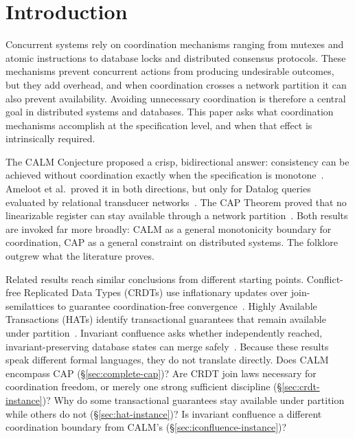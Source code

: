 \section{Introduction}
\label{sec:intro}

Concurrent systems rely on coordination mechanisms ranging from mutexes and
atomic instructions to database locks and distributed consensus protocols.
These mechanisms prevent concurrent actions from producing undesirable
outcomes, but they add overhead, and when coordination crosses a network
partition it can also prevent availability.  Avoiding unnecessary coordination
is therefore a central goal in distributed systems and databases.  This paper
asks what coordination mechanisms accomplish at the specification level, and
when that effect is intrinsically required.

The CALM Conjecture
proposed a crisp, bidirectional answer: consistency can be achieved without
coordination exactly when the specification is
monotone~\cite{hellerstein2010declarative}.  Ameloot et al.\ proved it in both
directions, but only for Datalog queries evaluated by relational
transducer networks~\cite{ameloot2013relational,hellerstein2020keeping}.  The
CAP Theorem proved that no linearizable register can stay available through a
network partition~\cite{brewer2000towards,gilbert2002cap}.  Both results are
invoked far more broadly: CALM as a general monotonicity boundary for
coordination, CAP as a general constraint on distributed systems.  The
folklore outgrew what the literature proves.

Related results reach similar conclusions from different starting points.
Conflict-free Replicated Data Types (CRDTs) use inflationary updates over
join-semilattices to guarantee coordination-free
convergence~\cite{shapiro2011crdt}.  Highly Available Transactions (HATs)
identify transactional guarantees that remain available under
partition~\cite{bailis2013hat}.  Invariant confluence asks whether
independently reached, invariant-preserving database states can merge
safely~\cite{bailis2014coordination}.  Because these results speak different
formal languages, they do not translate directly.  Does CALM encompass CAP
(\S\ref{sec:complete-cap})?  Are CRDT join laws necessary for coordination
freedom, or merely one strong sufficient discipline
(\S\ref{sec:crdt-instance})?  Why do some transactional guarantees
stay available under partition while others do not
(\S\ref{sec:hat-instance})?  Is invariant confluence a different coordination
boundary from CALM's (\S\ref{sec:iconfluence-instance})?

